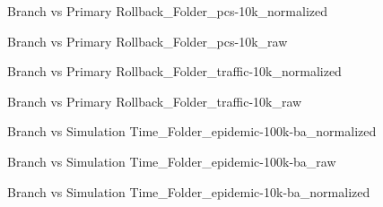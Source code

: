\begin{figure}[H]
\centering

\caption{Branch vs Primary Rollback\_Folder\_pcs-10k\_normalized}
\end{figure}
\vspace{1cm}
\begin{figure}[H]
\centering

\caption{Branch vs Primary Rollback\_Folder\_pcs-10k\_raw}
\end{figure}
\vspace{1cm}
\newpage
\begin{figure}[H]
\centering

\caption{Branch vs Primary Rollback\_Folder\_traffic-10k\_normalized}
\end{figure}
\vspace{1cm}
\begin{figure}[H]
\centering

\caption{Branch vs Primary Rollback\_Folder\_traffic-10k\_raw}
\end{figure}
\vspace{1cm}
\newpage
\begin{figure}[H]
\centering

\caption{Branch vs Simulation Time\_Folder\_epidemic-100k-ba\_normalized}
\end{figure}
\vspace{1cm}
\begin{figure}[H]
\centering

\caption{Branch vs Simulation Time\_Folder\_epidemic-100k-ba\_raw}
\end{figure}
\vspace{1cm}
\newpage
\begin{figure}[H]
\centering

\caption{Branch vs Simulation Time\_Folder\_epidemic-10k-ba\_normalized}
\end{figure}
